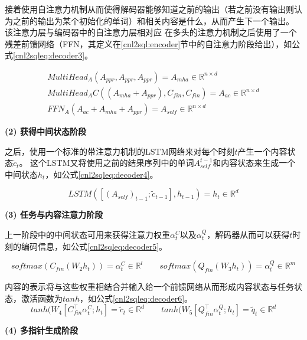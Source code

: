 接着使用自注意力机制\cite{vaswani2017attention}从而使得解码器能够知道之前的输出（若之前没有输出则认为之前的输出为某个初始化的单词）和相关内容是什么，从而产生下一个输出。
该注意力层与编码器中的自注意力层相对应
在多头的注意力机制之后使用了一个残差前馈网络（FFN，其定义在\ref{cnl2sql:encoder}节中的自注意力阶段给出），如公式\ref{cnl2sqleq:decoder3}。

\begin{gather}
  \label{cnl2sqleq:decoder3}
  MultiHead_A(A_{ppr},A_{ppr},A_{ppr}) = A_{mha} \in \mathbb{R}^{n \times d}\\
  MultiHead_{A}C((A_{mha} + A_{ppr}),C_{fin},C_{fin}) = A_{ac} \in \mathbb{R}^{n \times d}\\
  FFN_A(A_{ac} + A_{mha} + A_{ppr}) = A_{self} \in \mathbb{R}^{n \times d}
\end{gather}

\textbf{(2) 获得中间状态阶段}

之后，使用一个标准的带注意力机制的LSTM网络来对每个时刻$t$产生一个内容状态$\widetilde{c}_t$。
这个LSTM又将使用之前的结果序列中的单词$A^{t-1}_{self}$和内容状态来生成一个中间状态$h_t$，如公式\ref{cnl2sqleq:decoder4}。

\begin{equation}
  \label{cnl2sqleq:decoder4}
  LSTM([(A_{self})_{t-1};\widetilde{c}_{t-1}],h_{t-1})= h_t \in \mathbb{R}^{d} 
\end{equation}

\textbf{(3) 任务与内容注意力阶段}

上一阶段中的中间状态可用来获得注意力权重$\alpha^C_t$以及$\alpha^Q_t$，解码器从而可以获得$t$时刻的编码信息，如公式\ref{cnl2sqleq:decoder5}。

\begin{equation}
  \label{cnl2sqleq:decoder5}
  softmax(C_{fin}(W_2 h_t)) = \alpha^C_t \in \mathbb{R}^{l} \qquad softmax(Q_{fin}(W_3 h_t)) = \alpha^Q_t \in \mathbb{R}^{m}
\end{equation}


内容的表示将与这些权重相结合并输入给一个前馈网络从而形成内容状态与任务状态，激活函数为$tanh$，如公式\ref{cnl2sqleq:decoder6}。
\begin{equation}
  \label{cnl2sqleq:decoder6}
  tanh(W_4[C^{\top}_{fin}\alpha^C_t;h_t] = \widetilde{c}_{t} \in \mathbb{R}^{d} \qquad tanh(W_5[Q^{\top}_{fin}\alpha^Q_t;h_t] = \widetilde{q}_{t} \in \mathbb{R}^{d}
\end{equation}

\textbf{(4) 多指针生成阶段}

